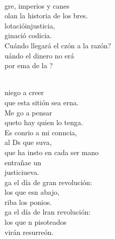 \documentclass[12pt]{article}
\begin{document}
\begin{multicols*}{2}
\begin{cancion}%
	    \\
	gre, imperios y canes\\
	olan la historia de los bres.\\
	lotacióinjusticia,\\
	ginació codicia.\\
	Cuándo llegará el czón a la razón?\\
	uándo el dinero no erá \\
	por ema de la ? \\\jump\\
	\begin{chorus}%
	 niego a creer\\
	que esta sitión sea erna.\\
	Me go a pensar \\
	queto hay quien lo tenga.\\
	Es conrio a mi conncia,\\
	al Ds que suva,\\
	que ha insto en cada ser mano\\
	entrañae un\\
	justiciueva.   \\
\jump
	ga el día de gran revolución:\\
	los que esn abajo,  \\
	riba los ponios.\\
	ga el día de lran revolución:\\
	los que n pisoteados \\
	virán resurreón.\\
	\end{chorus}%

\end{cancion}
\end{multicols*}
\end{document}
